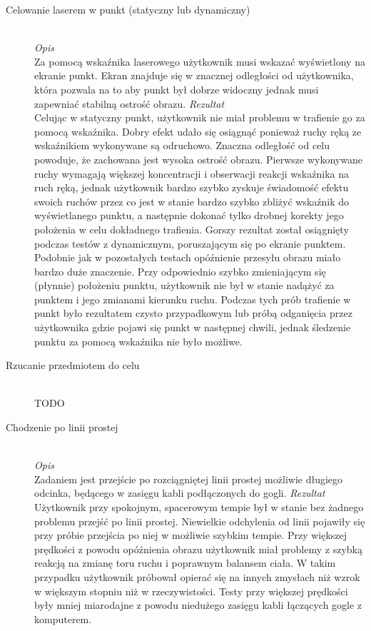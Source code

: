 \documentclass[a4paper,11pt,twoside]{report}
\theoremstyle{definition}
\begin{document}
\begin{description}
\item[Celowanie laserem w punkt (statyczny lub dynamiczny)] \hfill \\
\textit{Opis} \\
Za pomocą wskaźnika laserowego użytkownik musi wskazać wyświetlony na ekranie punkt. Ekran znajduje się w znacznej odległości od użytkownika, która pozwala na to aby punkt był dobrze widoczny jednak musi zapewniać stabilną ostrość obrazu.
\textit{Rezultat} \\
Celując w statyczny punkt, użytkownik nie miał problemu w trafienie go za pomocą wskaźnika. Dobry efekt udało się osiągnąć ponieważ ruchy ręką ze wskaźnikiem wykonywane są odruchowo. Znaczna odległość od celu powoduje, że zachowana jest wysoka ostrość obrazu. Pierwsze wykonywane ruchy wymagają większej koncentracji i obserwacji reakcji wskaźnika na ruch ręką, jednak użytkownik bardzo szybko zyskuje świadomość efektu swoich ruchów przez co jest w stanie bardzo szybko zbliżyć wskaźnik do wyświetlanego punktu, a następnie dokonać tylko drobnej korekty jego położenia w celu dokładnego trafienia. Gorszy rezultat został osiągnięty podczas testów z dynamicznym, poruszającym się po ekranie punktem. Podobnie jak w pozostałych testach opóźnienie przesyłu obrazu miało bardzo duże znaczenie. Przy odpowiednio szybko zmieniającym się (płynnie) położeniu punktu, użytkownik nie był w stanie nadążyć za punktem i jego zmianami kierunku ruchu. Podczas tych prób trafienie w punkt było rezultatem czysto przypadkowym lub próbą odganięcia przez użytkownika gdzie pojawi się punkt w następnej chwili, jednak śledzenie punktu  za pomocą wskaźnika nie było możliwe.

\item[Rzucanie przedmiotem do celu] \hfill \\
TODO

\item[Chodzenie po linii prostej] \hfill \\
\textit{Opis} \\
Zadaniem jest przejście po rozciągniętej linii prostej możliwie długiego odcinka, będącego w zasięgu kabli podłączonych do gogli.
\textit{Rezultat} \\
Użytkownik przy spokojnym, spacerowym tempie był w stanie bez żadnego problemu przejść po linii prostej. Niewielkie odchylenia od linii pojawiły się przy próbie przejścia po niej w możliwie szybkim tempie. Przy większej prędkości z powodu opóźnienia obrazu użytkownik miał problemy z szybką reakcją na zmianę toru ruchu i poprawnym balansem ciała. W takim przypadku użytkownik próbował opierać się na innych zmysłach niż wzrok w większym stopniu niż w rzeczywistości. Testy przy większej prędkości były mniej miarodajne z powodu niedużego zasięgu kabli łączących gogle z komputerem.
\end{description}
\end{document}
